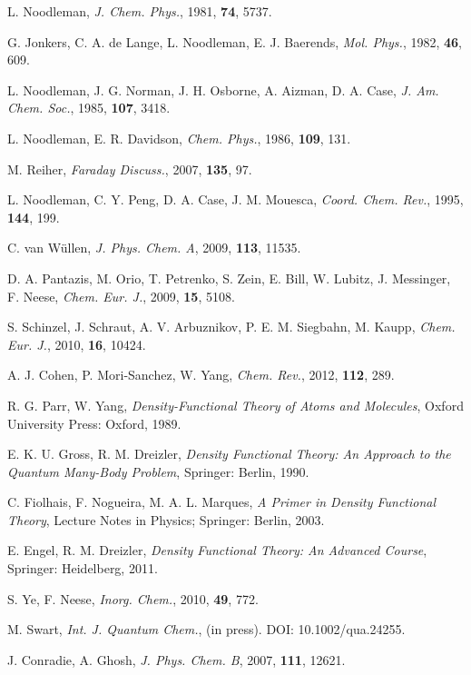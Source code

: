\documentclass[%
 preprint, linenumbers,
 amsmath,amssymb,
 aps, physrev,
]{revtex4-2}
\begin{document}
\begin{thebibliography}{144}
 L. Noodleman, \textit{J. Chem. Phys.}, 1981, \textbf{74}, 5737.

 G. Jonkers, C. A. de Lange, L. Noodleman, E. J. Baerends, \textit{Mol. Phys.}, 1982, \textbf{46}, 609.

 L. Noodleman, J. G. Norman, J. H. Osborne, A. Aizman, D. A. Case, \textit{J. Am. Chem. Soc.}, 1985, \textbf{107}, 3418.

 L. Noodleman, E. R. Davidson, \textit{Chem. Phys.}, 1986, \textbf{109}, 131.

 M. Reiher, \textit{Faraday Discuss.}, 2007, \textbf{135}, 97.

 L. Noodleman, C. Y. Peng, D. A. Case, J. M. Mouesca, \textit{Coord. Chem. Rev.}, 1995, \textbf{144}, 199.

 C. van Wüllen, \textit{J. Phys. Chem. A}, 2009, \textbf{113}, 11535.

 D. A. Pantazis, M. Orio, T. Petrenko, S. Zein, E. Bill, W. Lubitz, J. Messinger, F. Neese, \textit{Chem. Eur. J.}, 2009, \textbf{15}, 5108.

 S. Schinzel, J. Schraut, A. V. Arbuznikov, P. E. M. Siegbahn, M. Kaupp, \textit{Chem. Eur. J.}, 2010, \textbf{16}, 10424.

 A. J. Cohen, P. Mori-Sanchez, W. Yang, \textit{Chem. Rev.}, 2012, \textbf{112}, 289.

 R. G. Parr, W. Yang, \textit{Density-Functional Theory of Atoms and Molecules}, Oxford University Press: Oxford, 1989.

 E. K. U. Gross, R. M. Dreizler, \textit{Density Functional Theory: An Approach to the Quantum Many-Body Problem}, Springer: Berlin, 1990.

 C. Fiolhais, F. Nogueira, M. A. L. Marques, \textit{A Primer in Density Functional Theory}, Lecture Notes in Physics; Springer: Berlin, 2003.

 E. Engel, R. M. Dreizler, \textit{Density Functional Theory: An Advanced Course}, Springer: Heidelberg, 2011.

 S. Ye, F. Neese, \textit{Inorg. Chem.}, 2010, \textbf{49}, 772.

 M. Swart, \textit{Int. J. Quantum Chem.}, (in press). DOI: 10.1002/qua.24255.

 J. Conradie, A. Ghosh, \textit{J. Phys. Chem. B}, 2007, \textbf{111}, 12621.


\end{thebibliography}
\end{document}
